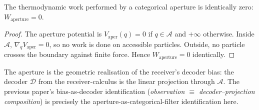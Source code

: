 \documentclass[11pt,twocolumn,a4paper]{article}
\newcommand{\D}{\mathcal{D}}
\newcommand{\Aper}{\mathcal{A}}
\begin{document}
\begin{theorem}\label{thm:zero-work}
The thermodynamic work performed by a categorical aperture is
identically zero: $W_{\mathrm{aperture}}=0$.
\end{theorem}

\begin{proof}
The aperture potential is $V_{\mathrm{aper}}(q)=0$ if $q\in\Aper$ and
$+\infty$ otherwise. Inside $\Aper$, $\nabla_q V_{\mathrm{aper}}=0$,
so no work is done on accessible particles. Outside, no particle
crosses the boundary against finite force. Hence $W_{\mathrm{aperture}}
=0$ identically.
\end{proof}

\begin{remark}\label{rem:aper-bias}
The aperture is the geometric realisation of the receiver's decoder
bias: the decoder $\D$ from the receiver-calculus is the linear
projection through $\Aper$. The previous paper's bias-as-decoder
identification (\emph{observation $\equiv$ decoder--projection
composition}) is precisely the aperture-as-categorical-filter
identification here.
\end{remark}
\end{document}
